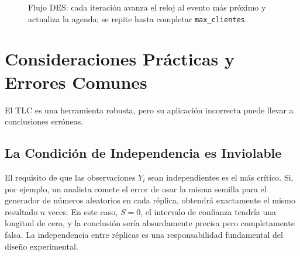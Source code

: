 \documentclass[11pt, letterpaper]{article}
\begin{document}
\begin{figure}[H]
{%
}
\caption{Flujo DES: cada iteración avanza el reloj al evento más próximo y actualiza la agenda; se repite hasta completar \texttt{max\_clientes}.}
\end{figure}

\newpage
\section{Consideraciones Prácticas y Errores Comunes}
El TLC es una herramienta robusta, pero su aplicación incorrecta puede llevar a conclusiones erróneas.

\subsection{La Condición de Independencia es Inviolable}
El requisito de que las observaciones $Y_i$ sean independientes es el más crítico. Si, por ejemplo, un analista comete el error de usar la misma semilla para el generador de números aleatorios en cada réplica, obtendrá exactamente el mismo resultado $n$ veces. En este caso, $S=0$, el intervalo de confianza tendría una longitud de cero, y la conclusión sería absurdamente precisa pero completamente falsa. La independencia entre réplicas es una responsabilidad fundamental del diseño experimental.
\end{document}
